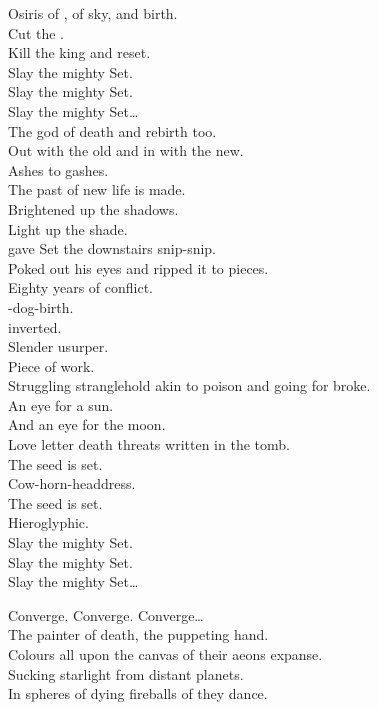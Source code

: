 Osiris of , of sky, and birth. \\
Cut the . \\
Kill the king and reset. \\

Slay the mighty Set. \\
Slay the mighty Set. \\
Slay the mighty Set… \\

The god of death and rebirth too. \\
Out with the old and in with the new. \\
Ashes to gashes. \\
The past of new life is made. \\
Brightened up the shadows. \\
Light up the shade. \\
 gave Set the downstairs snip-snip. \\
Poked out his eyes and ripped it to pieces. \\
Eighty years of conflict. \\
-dog-birth. \\
 inverted. \\
Slender usurper. \\
Piece of work. \\
Struggling stranglehold akin to poison and going for broke. \\
An eye for a sun. \\
And an eye for the moon. \\
Love letter death threats written in the tomb. \\

The seed is set. \\
Cow-horn-headdress. \\
The seed is set. \\
Hieroglyphic. \\

Slay the mighty Set. \\
Slay the mighty Set. \\
Slay the mighty Set… \\


Converge. Converge. Converge… \\

The painter of death, the puppeting hand. \\
Colours all upon the canvas of their aeons expanse. \\
Sucking starlight from distant planets. \\
In spheres of dying fireballs of  they dance. \\

